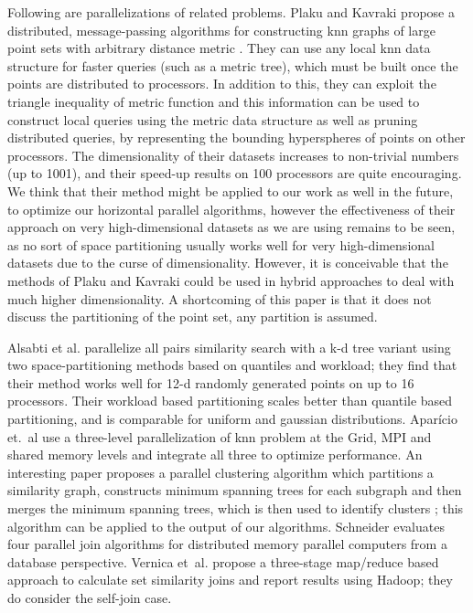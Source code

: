 \documentclass{comjnl}
\begin{document}
Following are parallelizations of related problems.  Plaku and
Kavraki propose a distributed, message-passing algorithms for
constructing knn graphs of large point sets with arbitrary distance
metric \cite{plaku-distknn}. They can use any local knn data structure
for faster queries (such as a metric tree), which must be built once
the points are distributed to processors.  In addition to this, they
can exploit the triangle inequality of metric function and this
information can be used to construct local queries using the metric
data structure as well as pruning distributed queries, by representing
the bounding hyperspheres of points on other processors.  The
dimensionality of their datasets increases to non-trivial numbers (up
to 1001), and their speed-up results on 100 processors are quite
encouraging.  We think that their method might be applied to our work
as well in the future, to optimize our horizontal parallel algorithms,
however the effectiveness of their approach on very high-dimensional
datasets as we are using remains to be seen, as no sort of space
partitioning usually works well for very high-dimensional datasets due
to the curse of dimensionality.
However, it is conceivable that the methods of Plaku and Kavraki could
be used in hybrid approaches to deal with much higher dimensionality.
A shortcoming of this paper is that it does not discuss the
partitioning of the point set, any partition is assumed.

Alsabti et al. \cite{alsabti98} parallelize all pairs similarity search with a k-d tree
variant using two space-partitioning methods based on quantiles and
workload; they find that their method works well for 
12-d randomly generated points on up to 16 processors. Their workload
based partitioning scales better than quantile based partitioning, and
is comparable for uniform and gaussian distributions.  Apar\'{i}cio
et.~al \cite{aparicio2007} use a three-level parallelization of knn
problem at the Grid, MPI and shared memory levels and integrate all three to optimize
performance.  An interesting paper proposes a
parallel clustering algorithm which partitions a similarity graph,
constructs minimum spanning trees for each subgraph and then merges
the minimum spanning trees, which is then used to identify clusters
\cite{olman2009}; this algorithm can be applied to the output of our
algorithms. Schneider \cite{schneider1989} evaluates four parallel join algorithms for
distributed memory parallel computers from a database perspective. 
Vernica et~al. \cite{vernica2010}  propose a three-stage map/reduce
based approach to calculate set similarity joins and report results
using Hadoop; they do consider the self-join case.
\end{document}
